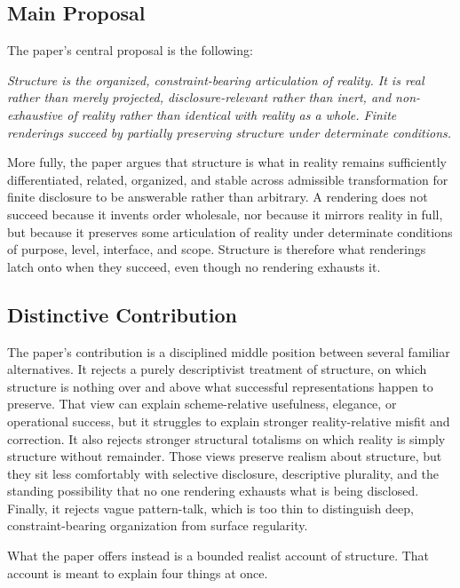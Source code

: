 \documentclass[11pt]{article}
\renewenvironment{quote}
  {\list{}{\leftmargin=1.4em \rightmargin=1.0em}%
   \item\relax\color{softink}\itshape}
  {\endlist}
\begin{document}
\subsection{Main Proposal}

The paper's central proposal is the following:

\begin{quote}
Structure is the organized, constraint-bearing articulation of reality. It is real rather than merely projected, disclosure-relevant rather than inert, and non-exhaustive of reality rather than identical with reality as a whole. Finite renderings succeed by partially preserving structure under determinate conditions.
\end{quote}

More fully, the paper argues that structure is what in reality remains sufficiently differentiated, related, organized, and stable across admissible transformation for finite disclosure to be answerable rather than arbitrary. A rendering does not succeed because it invents order wholesale, nor because it mirrors reality in full, but because it preserves some articulation of reality under determinate conditions of purpose, level, interface, and scope. Structure is therefore what renderings latch onto when they succeed, even though no rendering exhausts it.

\subsection{Distinctive Contribution}

The paper's contribution is a disciplined middle position between several familiar alternatives. It rejects a purely descriptivist treatment of structure, on which structure is nothing over and above what successful representations happen to preserve. That view can explain scheme-relative usefulness, elegance, or operational success, but it struggles to explain stronger reality-relative misfit and correction. It also rejects stronger structural totalisms on which reality is simply structure without remainder. Those views preserve realism about structure, but they sit less comfortably with selective disclosure, descriptive plurality, and the standing possibility that no one rendering exhausts what is being disclosed. Finally, it rejects vague pattern-talk, which is too thin to distinguish deep, constraint-bearing organization from surface regularity.

What the paper offers instead is a bounded realist account of structure. That account is meant to explain four things at once.
\end{document}
